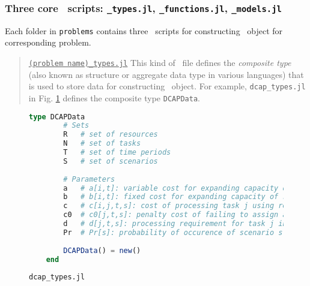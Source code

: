 \subsubsection{Three core \julia\ scripts: \texttt{\_types.jl}, \texttt{\_functions.jl}, \texttt{\_models.jl}}
Each folder in \texttt{problems} contains three \julia\ scripts for constructing \jumpmodel\ object for corresponding problem.

\begin{quote}
\noindent\underline{\texttt{(problem name)\_types.jl}} This kind of \julia\ file defines the \textit{composite type} (also known as structure or aggregate data type in various languages) that is used to store data for constructing \jumpmodel\ object. For example, \texttt{dcap\_types.jl} in Fig. \ref{fig:dcap_types} defines the composite type \texttt{DCAPData}.
\end{quote}
\begin{figure}[H]
	\centering
	\begin{lstlisting}[frame=single,language=julia]
	type DCAPData
		# Sets
		R   # set of resources 
		N   # set of tasks 
		T   # set of time periods 
		S   # set of scenarios 
		
		# Parameters
		a   # a[i,t]: variable cost for expanding capacity of resource i at time t
		b   # b[i,t]: fixed cost for expanding capacity of resource i at time t
		c   # c[i,j,t,s]: cost of processing task j using resource i in period t under scenario s
		c0  # c0[j,t,s]: penalty cost of failing to assign a resource to task j under scenario s
		d   # d[j,t,s]: processing requirement for task j in period t under scenario s
		Pr  # Pr[s]: probability of occurence of scenario s
	
		DCAPData() = new()
	end
	\end{lstlisting}
	\caption{\texttt{dcap\_types.jl}}\label{fig:dcap_types}
\end{figure}

